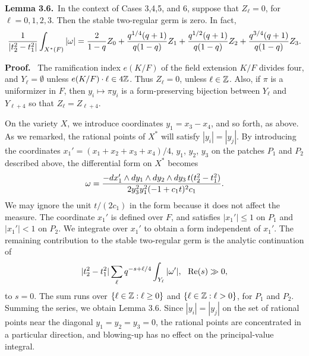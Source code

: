 \bigskip
\noindent
{\bf Lemma 3.6.}\   In the context of Cases 3,4,5, and 6, suppose that
$Z_\ell=0$,
for $\ell=0,1,2,3$.  Then the stable
two-regular germ is zero.
In fact,
$$
{1\over |t_2^2-t_1^2|} \int_{X^*(F)}|\omega| =
{2\over 1-q} Z_0 + {q^{1/4} (q+1)\over q (1-q)} Z_1 +
{q^{1/2} (q+1)\over q (1-q)} Z_2 + {q^{3/4} (q+1)\over q (1-q)}
Z_3.$$
\bigskip

\noindent
{\bf Proof. }\   The ramification index
$e(K/F)$ of the field extension $K/F$
divides four, and $Y_{\ell}=\emptyset$
unless $e(K/F)\cdot\ell\in {4}{\Bbb Z}$.
Thus $Z_\ell=0$, unless $\ell\in {\Bbb Z}$.
  Also, if $\pi$ is a uniformizer
in $F$, then $y_i\mapsto \pi y_i$ is a 
form-preserving bijection between
$Y_\ell$ and $Y_{\ell+4}$ so that $Z_\ell=Z_{\ell+4}$.

On the variety $X$, we introduce coordinates $y_1=x_3-x_4$, 
and so forth, as above.  As we remarked, the rational points
of $X^*$ will satisfy $|y_i|=|y_j|$.  By introducing the
coordinates $x_1' = (x_1+x_2+x_3+x_4)/4$, $y_1$, $y_2$, $y_3$
on the patches $P_1$ and $P_2$ described above, the 
differential form on $X^*$ 
becomes
$$\omega = {-dx_1'\wedge dy_1\wedge dy_2 \wedge dy_3 \, 
          t (t_2^2-t_1^2)\over
          2 y_3^2 y_1^2 (-1 + c_1 t)^2 c_1}.$$
We may ignore the unit $t/(2c_1)$ in the form because it does
not affect the measure.  The coordinate $x_1'$ is defined over
$F$, and satisfies $|x_1'|\le 1$ on $P_1$ and $|x_1'|<1$ on
$P_2$.  We integrate over $x_1'$ to obtain a form independent
of $x_1'$.  The remaining contribution to the stable
two-regular germ is the analytic continuation of
$$
|t_2^2-t_1^2|\sum_\ell q^{-s+\ell/4} \int_{Y_\ell}
|\omega'|,
\ \ \hbox{Re}(s)\gg 0,$$
to $s=0$.  The sum runs over $\{\ell\in {\Bbb Z}: \ell\ge 0\}$
and $\{\ell\in {\Bbb Z}:\ell > 0\}$, for $P_1$ and $P_2$.
Summing the series, we obtain Lemma 3.6.
Since $|y_i|=|y_j|$
on the set of rational points near the diagonal $y_1=y_2=y_3=0$,
the rational points are concentrated in a particular direction,
and blowing-up has no effect on the principal-value integral.
\hfill\x

